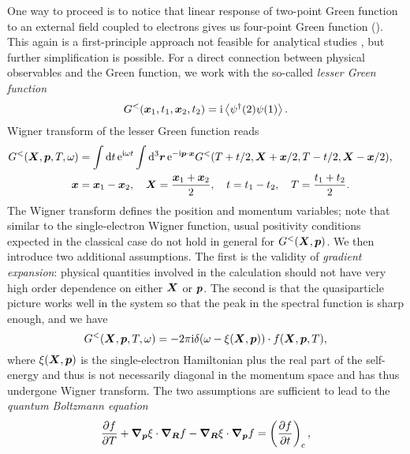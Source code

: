\documentclass[hyperref, a4paper]{article}
\newcommand*{\ii}{\mathrm{i}}
\newcommand*{\ee}{\mathrm{e}}
\begin{document}
One way to proceed is to notice that 
linear response of two-point Green function 
to an external field coupled to electrons 
gives us four-point Green function
().
This again is a first-principle approach 
not feasible for analytical studies
\cite{PhysRevB.84.245110},
but further simplification is possible.
For a direct connection between physical observables and the Green function,
we work with the so-called \emph{lesser Green function}
\begin{equation}
    G^<(\vb*{x}_1, t_1, \vb*{x}_2, t_2) = \ii \expval{\psi^\dagger(2) \psi(1)}.
\end{equation}
Wigner transform of the lesser Green function reads
\begin{equation}
    \begin{aligned}
        G^<(\vb*{X}, \vb*{p}, T, \omega) &= 
        \int \dd{t} \ee^{\ii \omega t}
        \int \dd[3]{\vb*{r}} \ee^{- \ii \vb*{p} \cdot \vb*{x}} 
        G^<(T + t / 2, \vb*{X} + \vb*{x} / 2, T - t/2, \vb*{X} - \vb*{x} / 2), \quad \\
        \vb*{x} &= \vb*{x}_1 - \vb*{x}_2, \quad 
        \vb*{X} = \frac{\vb*{x}_1 + \vb*{x}_2}{2}, \quad 
        t = t_1 - t_2, \quad T = \frac{t_1 + t_2}{2}.
    \end{aligned}
\end{equation}
The Wigner transform
defines the position and momentum variables;
note that similar to the single-electron Wigner function,
usual positivity conditions expected in the classical case 
do not hold in general for $G^<(\vb*{X}, \vb*{p})$.
We then introduce two additional assumptions.
The first is the validity of \emph{gradient expansion}:
physical quantities involved in the calculation 
should not have very high order dependence on either $\vb*{X}$ or $\vb*{p}$.
The second is that the quasiparticle picture works well in the system 
so that the peak in the spectral function is sharp enough, and we have 
\begin{equation}
    G^<(\vb*{X}, \vb*{p}, T, \omega) = - 2 \pi \ii \delta(\omega - \xi(\vb*{X}, \vb*{p})) \cdot 
    f(\vb*{X}, \vb*{p}, T),
\end{equation}
where $\xi(\vb*{X}, \vb*{p})$ is the 
single-electron Hamiltonian plus the real part of the self-energy 
and thus is not necessarily diagonal in the momentum space 
and has thus undergone Wigner transform.
The two assumptions are sufficient to lead to the \emph{quantum Boltzmann equation}
\begin{equation}
    \pdv{f}{T} + \grad_{\vb*{p}} \xi \cdot \grad_{\vb*{R}} f 
    - \grad_{\vb*{R}} \xi \cdot \grad_{\vb*{p}} f 
    = \left(\pdv{f}{t}\right)_{\text{c}}, 
    \label{eq:quantum-boltzmann}
\end{equation}
\end{document}
